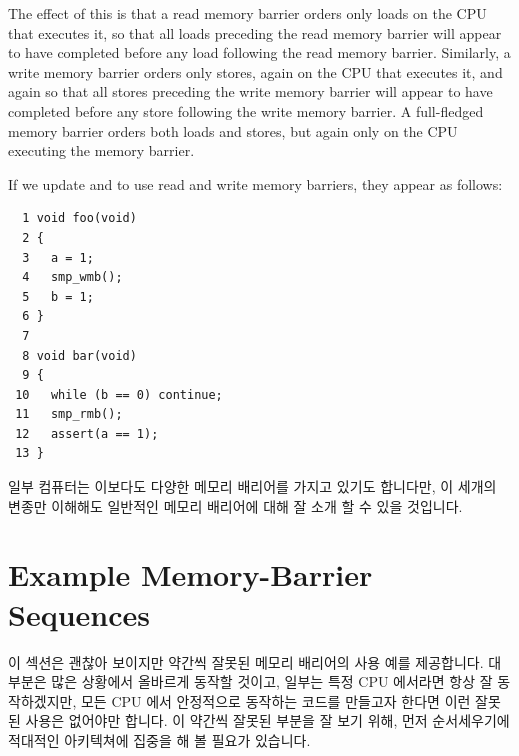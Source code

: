 The effect of this is that a read memory barrier orders only loads
on the CPU that executes it, so that all loads preceding the read memory
barrier will appear to have completed before any load following the
read memory barrier.
Similarly, a write memory barrier orders
only stores, again on the CPU that executes it, and again so that
all stores preceding the write memory barrier will appear to have
completed before any store following the write memory barrier.
A full-fledged memory barrier orders both loads and stores, but again
only on the CPU executing the memory barrier.

If we update  and  to use read and write memory
barriers, they appear as follows:
\fi

\vspace{5pt}
\begin{minipage}[t]{\columnwidth}
\small
\begin{verbatim}
  1 void foo(void)
  2 {
  3   a = 1;
  4   smp_wmb();
  5   b = 1;
  6 }
  7
  8 void bar(void)
  9 {
 10   while (b == 0) continue;
 11   smp_rmb();
 12   assert(a == 1);
 13 }
\end{verbatim}
\end{minipage}
\vspace{5pt}

일부 컴퓨터는 이보다도 다양한 메모리 배리어를 가지고 있기도 합니다만, 이 세개의
변종만 이해해도 일반적인 메모리 배리어에 대해 잘 소개 할 수 있을 것입니다.

\section{Example Memory-Barrier Sequences}
\label{sec:app:whymb:Example Memory-Barrier Sequences}

이 섹션은 괜찮아 보이지만 약간씩 잘못된 메모리 배리어의 사용 예를 제공합니다.
대부분은 많은 상황에서 올바르게 동작할 것이고, 일부는 특정 CPU 에서라면 항상 잘
동작하겠지만, 모든 CPU 에서 안정적으로 동작하는 코드를 만들고자 한다면 이런
잘못된 사용은 없어야만 합니다.
이 약간씩 잘못된 부분을 잘 보기 위해, 먼저 순서세우기에 적대적인 아키텍쳐에
집중을 해 볼 필요가 있습니다.


